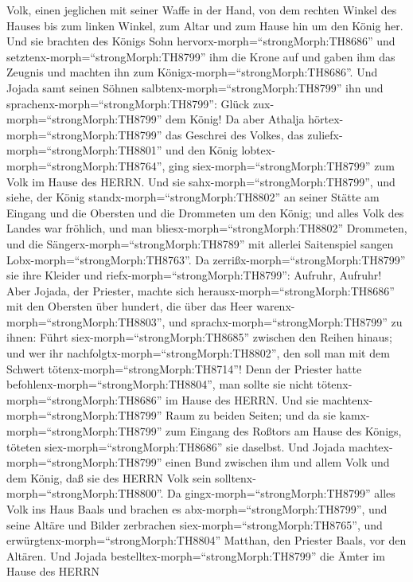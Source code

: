 Volk, einen jeglichen mit seiner Waffe in der Hand, von dem rechten
Winkel des Hauses bis zum linken Winkel, zum Altar und zum Hause hin um
den König her.  Und sie brachten des Königs Sohn
hervorx-morph=``strongMorph:TH8686'' und
setztenx-morph=``strongMorph:TH8799'' ihm die Krone auf und gaben ihm
das Zeugnis und machten ihn zum Königx-morph=``strongMorph:TH8686''. Und
Jojada samt seinen Söhnen salbtenx-morph=``strongMorph:TH8799'' ihn und
sprachenx-morph=``strongMorph:TH8799'': Glück
zux-morph=``strongMorph:TH8799'' dem König!  Da aber
Athalja hörtex-morph=``strongMorph:TH8799'' das Geschrei des Volkes, das
zuliefx-morph=``strongMorph:TH8801'' und den König
lobtex-morph=``strongMorph:TH8764'', ging
siex-morph=``strongMorph:TH8799'' zum Volk im Hause des HERRN.
 Und sie sahx-morph=``strongMorph:TH8799'', und siehe, der
König standx-morph=``strongMorph:TH8802'' an seiner Stätte am Eingang
und die Obersten und die Drommeten um den König; und alles Volk des
Landes war fröhlich, und man bliesx-morph=``strongMorph:TH8802''
Drommeten, und die Sängerx-morph=``strongMorph:TH8789'' mit allerlei
Saitenspiel sangen Lobx-morph=``strongMorph:TH8763''. Da
zerrißx-morph=``strongMorph:TH8799'' sie ihre Kleider und
riefx-morph=``strongMorph:TH8799'': Aufruhr, Aufruhr!  Aber
Jojada, der Priester, machte sich herausx-morph=``strongMorph:TH8686''
mit den Obersten über hundert, die über das Heer
warenx-morph=``strongMorph:TH8803'', und
sprachx-morph=``strongMorph:TH8799'' zu ihnen: Führt
siex-morph=``strongMorph:TH8685'' zwischen den Reihen hinaus; und wer
ihr nachfolgtx-morph=``strongMorph:TH8802'', den soll man mit dem
Schwert tötenx-morph=``strongMorph:TH8714''! Denn der Priester hatte
befohlenx-morph=``strongMorph:TH8804'', man sollte sie nicht
tötenx-morph=``strongMorph:TH8686'' im Hause des HERRN. 
Und sie machtenx-morph=``strongMorph:TH8799'' Raum zu beiden Seiten; und
da sie kamx-morph=``strongMorph:TH8799'' zum Eingang des Roßtors am
Hause des Königs, töteten siex-morph=``strongMorph:TH8686'' sie
daselbst.  Und Jojada machtex-morph=``strongMorph:TH8799''
einen Bund zwischen ihm und allem Volk und dem König, daß sie des HERRN
Volk sein solltenx-morph=``strongMorph:TH8800''.  Da
gingx-morph=``strongMorph:TH8799'' alles Volk ins Haus Baals und brachen
es abx-morph=``strongMorph:TH8799'', und seine Altäre und Bilder
zerbrachen siex-morph=``strongMorph:TH8765'', und
erwürgtenx-morph=``strongMorph:TH8804'' Matthan, den Priester Baals, vor
den Altären.  Und Jojada
bestelltex-morph=``strongMorph:TH8799'' die Ämter im Hause des HERRN
